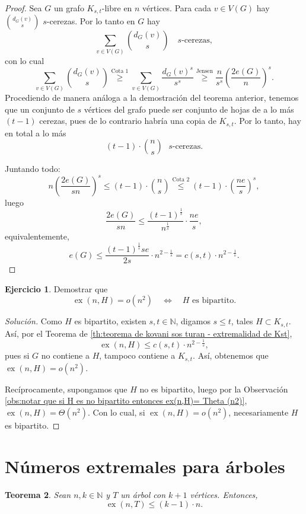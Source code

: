 \documentclass[12pt]{report}
\theoremstyle{plain}
\newtheorem{theorem}{Teorema}[section]
\theoremstyle{definition}
\newtheorem{exercise}[theorem]{Ejercicio}
\newenvironment{solution}{\begin{proof}[Solución]}{\end{proof}}
\newcommand{\naturals}{\mathbb{N}}
\newcommand{\ex}[2]{\operatorname{ex} (#1, #2)}
\begin{document}
\begin{proof}
Sea $G$ un grafo $K_{s,t}$-libre en $n$ vértices. Para cada $v \in V(G)$ hay $\binom{d_G(v)}{s}$ $s$-cerezas. Por lo tanto en $G$ hay
\[
    \sum_{v \in V(G)} \binom{d_G(v)}{s} \quad \text{$s$-cerezas},
\]
con lo cual
\[
    \sum_{v \in V(G)} \binom{d_G (v)} s \overset{\text{Cota 1}}{\geq} \sum_{v \in V(G)} \frac{d_G (v)^s}{s^s} \overset{\text{Jensen}}{\geq} \frac{n}{s^s} \left ( \frac{2e(G)}{n} \right)^s .
\]
Procediendo de manera análoga a la demostración del teorema anterior, tenemos que un conjunto de $s$ vértices del grafo puede ser conjunto de hojas de a lo más $(t-1)$ cerezas, pues de lo contrario habría una copia de $K_{s,t}$. Por lo tanto, hay en total a lo más
\[
    (t-1) \cdot \binom{n}s \text{ $s$-cerezas}.
\]

Juntando todo:
\[
    n \left ( \frac{2 e(G)}{s n} \right)^s \leq (t-1) \cdot \binom n s \overset{\text{Cota 2}}{\leq} (t-1) \cdot \left (\frac{n e}{s} \right )^s,
\]
luego
\[
    \frac{2 e(G)}{s n} \leq \frac{(t-1)^{\frac 1 s}}{n^{\frac 1 s}} \cdot \frac{n e}{s},
\]
equivalentemente,
\[
    e(G) \leq {\frac{(t-1)^{\frac 1 s} s e}{2 s}} \cdot n^{2-\frac{1}{s}} = c(s,t ) \cdot n ^{2 - \frac 1 s}.
\]
\end{proof}

\begin{exercise}
Demostrar que
\[
    \ex n H = o (n^2) \quad \Leftrightarrow \quad H \text{ es bipartito}.
\]
\end{exercise}
\begin{solution}
Como $H$ es bipartito, existen $s,t \in \naturals$, digamos $s \leq t$, tales $H \subset K_{s,t}$. Así, por el Teorema de \ref{th:teorema de kovani sos turan - extremalidad de Kst},
\[
    \ex n H \leq c(s,t) \cdot n^{2 - \frac{1}{s}},
\]
pues si $G$ no contiene a $H$, tampoco contiene a $K_{s,t}$. Así, obtenemos que $\ex n H = o(n^2)$.

Recíprocamente, supongamos que $H$ no es bipartito, luego por la Observación \ref{obs:notar que si H es no bipartito entonces ex(n,H)= Theta (n2)}, $\ex n H = \Theta (n^2)$. Con lo cual, si $\ex n H= o (n^2)$, necesariamente $H$ es bipartito.
\end{solution}


\section{Números extremales para árboles}



\begin{theorem}
Sean $n,k \in \naturals$ y $T$ un árbol con $k+1$ vértices. Entonces,
\[
    \ex n T \leq (k-1) \cdot n.
\]
\end{theorem}
\end{document}

